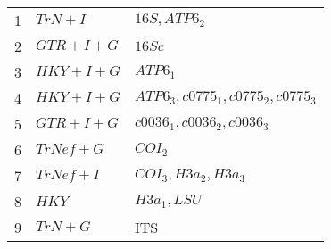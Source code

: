 \documentclass{article}
\begin{document}



\begin{table}
  \centering
  \begin{tabular} { | l | l | l |}
    1      & $TrN+I$      & $16S, ATP6_2$ \\
    2      & $GTR+I+G$    & $16Sc$        \\
    3      & $HKY+I+G$    & $ATP6_1$\\ 
    4      & $HKY+I+G$    & $ATP6_3, c0775_1, c0775_2, c0775_3$\\ 
    5      & $GTR+I+G$    & $c0036_1, c0036_2, c0036_3$\\ 
    6      & $TrNef+G$    & $COI_2$ \\
    7      & $TrNef+I$    & $COI_3, H3a_2, H3a_3$\\ 
    8      & $HKY$        & $H3a_1, LSU$\\ 
    9      & $TrN+G$      & ITS \\       
  \end{tabular}
\end{table}
\end{document}
